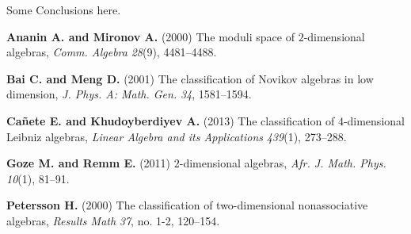 \documentclass{CUP-JNL-DTM}%
\theoremstyle{definition}
\numberwithin{equation}{section}
\begin{document}
Some Conclusions here.



\begin{Backmatter}
\begin{thebibliography}{}
\textbf{Ananin A. and Mironov A.} (2000) The moduli space of $2$-dimensional algebras, \textit{Comm. Algebra} \textit{28}(9),  {4481}--{4488}.

\textbf{Bai C. and Meng D.} (2001) The classification of Novikov algebras in low dimension,  \textit{J. Phys. A: Math. Gen.} \textit{34}, {1581}--{1594}.

\textbf{Ca\~{n}ete E. and Khudoyberdiyev A.} (2013) The classification of $4$-dimensional Leibniz algebras,  \textit{Linear Algebra and its Applications}  \textit{439}(1), {273}--{288}.

\textbf{Goze M. and Remm E.} (2011)  $2$-dimensional algebras,  \textit{Afr. J. Math. Phys.} \textit{10}(1),  {81}--{91}.

\textbf{Petersson H.} (2000) The classification of two-dimensional nonassociative algebras,  \textit{Results Math} \textit{37}, no. 1-2,  {120}--{154}.


\end{thebibliography}

\end{Backmatter}
\end{document}
